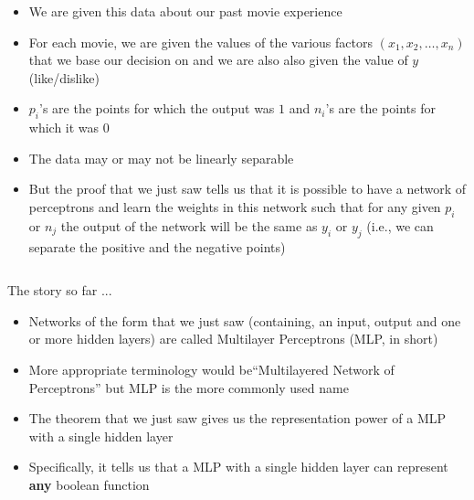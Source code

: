 \documentclass[serif, aspectratio=169]{beamer}
\begin{document}
\begin{frame}
\begin{columns}
\begin{overlayarea}{\textwidth}{\textheight}
\begin{itemize}\justifying
\item<1-> We are given this data about our past movie experience
\item<2->For each movie, we are given the values of the various factors $(x_1, x_2,\dots, x_n)$ that we base our decision on and we are also also given the value of $y$ (like/dislike)
\item<3-> $p_i$'s are the points for which the output was $1$ and $n_i$'s are the points for which it was $0$ 
\item<4->The data may or may not be linearly separable 
\item<5-> But the proof that we just saw tells us that it is possible to have a network of perceptrons and learn the weights in this network such that for any given $p_i$ or $n_j$ the output of the network will be the same as $y_i$ or $y_j$ (i.e., we can separate the positive and the negative points)
\end{itemize}
\end{overlayarea}
\end{columns}

\end{frame}


\begin{frame}
\begin{block}{The story so far ...}
\begin{itemize}\justifying
\item<1-> Networks of the form that we just saw (containing, an input, output and one or more hidden layers) are called Multilayer Perceptrons (MLP, in short)
\item<2-> More appropriate terminology would be``Multilayered Network of Perceptrons'' but MLP is the more commonly used name
\item<3-> The theorem that we just saw gives us the representation power of a MLP with a single hidden layer
\item<4-> Specifically, it tells us that a MLP with a single hidden layer can represent \textbf{any} boolean function
\end{itemize}
\end{block}
\end{frame}
\end{document}
